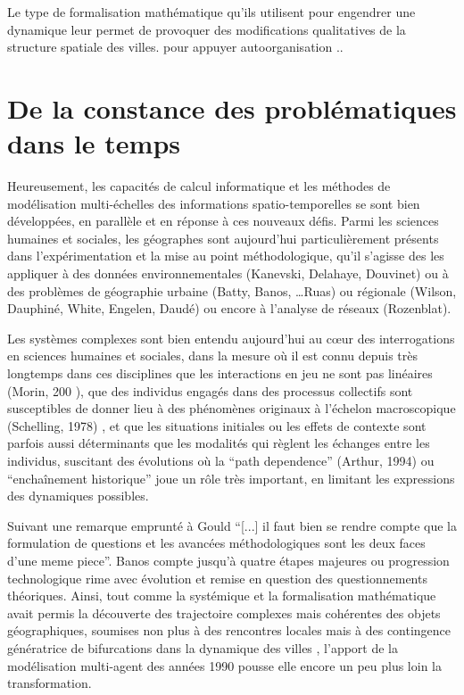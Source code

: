 {Le type de formalisation mathématique qu'ils utilisent pour engendrer une dynamique leur permet de provoquer des modifications qualitatives de la structure spatiale des villes. \autocite{pumain1984} pour appuyer autoorganisation ..

\section{De la constance des problématiques dans le temps}

Heureusement, les capacités de calcul informatique et les méthodes de modélisation multi-échelles des informations spatio-temporelles se sont bien développées, en parallèle et en réponse à ces nouveaux défis. Parmi les sciences humaines et sociales, les géographes sont aujourd'hui particulièrement présents dans l’expérimentation et la mise au point méthodologique, qu’il s’agisse des les appliquer à des données environnementales (Kanevski, Delahaye, Douvinet) ou à des problèmes de géographie urbaine (Batty, Banos, …Ruas) ou régionale (Wilson, Dauphiné, White, Engelen, Daudé) ou encore à l’analyse de réseaux (Rozenblat). 

Les systèmes complexes sont bien entendu aujourd'hui au cœur des interrogations en sciences humaines et sociales, dans la mesure où il est connu depuis très longtemps dans ces disciplines que les interactions en jeu ne sont pas linéaires   (Morin, 200 ), que des individus engagés dans des processus collectifs sont susceptibles de donner lieu à des phénomènes originaux à l’échelon macroscopique (Schelling, 1978) , et que les situations initiales ou les effets de contexte sont parfois aussi déterminants que les modalités qui règlent les échanges entre les individus, suscitant des évolutions où la \foreignquote{english}{path dependence}  (Arthur, 1994) ou \enquote{enchaînement historique} joue un rôle très important, en limitant les expressions des dynamiques possibles.

Suivant une remarque emprunté à Gould \autocite[31]{Gould2004} \enquote{[...] il faut bien se rendre compte que la formulation de questions et les avancées méthodologiques sont les deux faces d'une meme piece}. Banos \autocite{Banos2013} compte jusqu'à quatre étapes majeures ou progression technologique rime avec évolution et remise en question des questionnements théoriques. Ainsi, tout comme la systémique et la formalisation mathématique avait permis la découverte des trajectoire complexes mais cohérentes des objets géographiques, soumises non plus à des rencontres locales mais à des contingence génératrice de bifurcations dans la dynamique des villes \autocite[137]{Pumain2002}, l'apport de la modélisation multi-agent des années 1990 pousse elle encore un peu plus loin la transformation. \autocite{Sanders2007}

}
